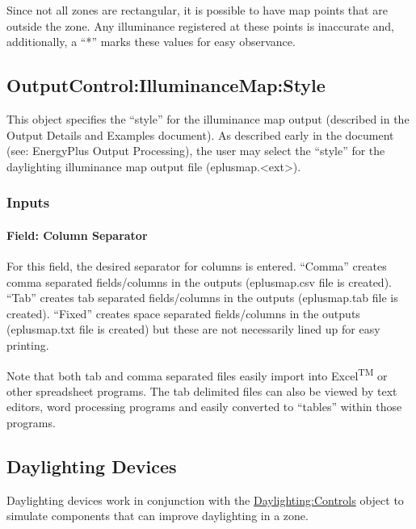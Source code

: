 Since not all zones are rectangular, it is possible to have map points that are outside the zone. Any illuminance registered at these points is inaccurate and, additionally, a ``*'' marks these values for easy observance.

\subsection{OutputControl:IlluminanceMap:Style}\label{outputcontrolilluminancemapstyle}

This object specifies the ``style'' for the illuminance map output (described in the Output Details and Examples document). As described early in the document (see: EnergyPlus Output Processing), the user may select the ``style'' for the daylighting illuminance map output file (eplusmap.\textless{}ext\textgreater{}).

\subsubsection{Inputs}\label{inputs-5-006}

\paragraph{Field: Column Separator}\label{field-column-separator}

For this field, the desired separator for columns is entered. ``Comma'' creates comma separated fields/columns in the outputs (eplusmap.csv file is created). ``Tab'' creates tab separated fields/columns in the outputs (eplusmap.tab file is created). ``Fixed'' creates space separated fields/columns in the outputs (eplusmap.txt file is created) but these are not necessarily lined up for easy printing.

Note that both tab and comma separated files easily import into Excel\textsuperscript{TM} or other spreadsheet programs. The tab delimited files can also be viewed by text editors, word processing programs and easily converted to ``tables'' within those programs.

\subsection{Daylighting Devices}\label{daylighting-devices}

Daylighting devices work in conjunction with the \hyperref[daylightingcontrols-000]{Daylighting:Controls} object to simulate components that can improve daylighting in a zone.

